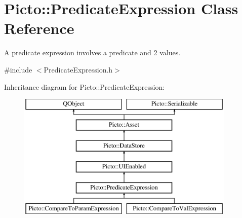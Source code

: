 \hypertarget{class_picto_1_1_predicate_expression}{\section{Picto\-:\-:Predicate\-Expression Class Reference}
\label{class_picto_1_1_predicate_expression}
}


A predicate expression involves a predicate and 2 values.  




{\ttfamily \#include $<$Predicate\-Expression.\-h$>$}

Inheritance diagram for Picto\-:\-:Predicate\-Expression\-:\begin{figure}[H]
\begin{center}
\leavevmode
\includegraphics[height=6.000000cm]{class_picto_1_1_predicate_expression}
\end{center}
\end{figure}
